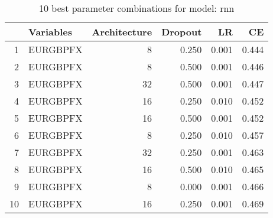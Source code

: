 \begin{table}[ht]
\centering
\begin{tabular}{rlrrrr}
  \hline
 & Variables & Architecture & Dropout & LR & CE \\ 
  \hline
1 & EURGBPFX &    8 & 0.250 & 0.001 & 0.444 \\ 
  2 & EURGBPFX &    8 & 0.500 & 0.001 & 0.446 \\ 
  3 & EURGBPFX &   32 & 0.500 & 0.001 & 0.447 \\ 
  4 & EURGBPFX &   16 & 0.250 & 0.010 & 0.452 \\ 
  5 & EURGBPFX &   16 & 0.500 & 0.001 & 0.452 \\ 
  6 & EURGBPFX &    8 & 0.250 & 0.010 & 0.457 \\ 
  7 & EURGBPFX &   32 & 0.250 & 0.001 & 0.463 \\ 
  8 & EURGBPFX &   16 & 0.500 & 0.010 & 0.465 \\ 
  9 & EURGBPFX &    8 & 0.000 & 0.001 & 0.466 \\ 
  10 & EURGBPFX &   16 & 0.250 & 0.001 & 0.469 \\ 
   \hline
\end{tabular}
\caption{10 best parameter combinations for model: rnn} 
\label{tab:rnn_top_10}
\end{table}
